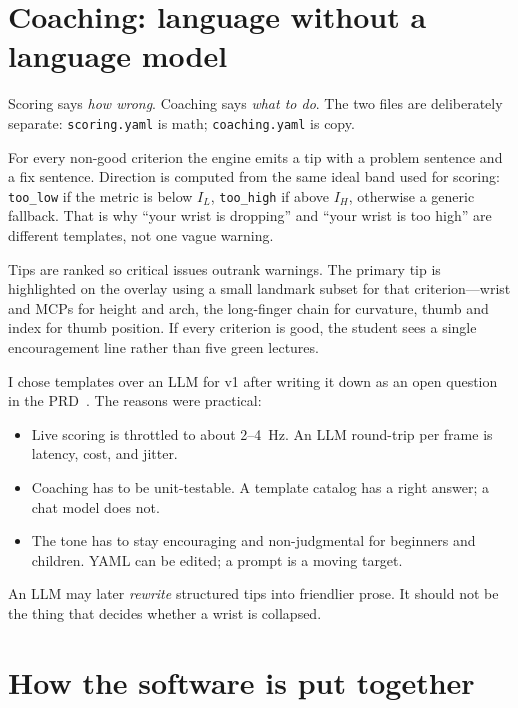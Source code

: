 \documentclass[11pt,a4paper]{article}
\newcommand{\code}[1]{\texttt{#1}}
\begin{document}
\section{Coaching: language without a language model}
\label{sec:coaching}

Scoring says \emph{how wrong}.
Coaching says \emph{what to do}.
The two files are deliberately separate: \code{scoring.yaml} is math; \code{coaching.yaml} is copy.

For every non-good criterion the engine emits a tip with a problem sentence and a fix sentence.
Direction is computed from the same ideal band used for scoring:
\texttt{too\_low} if the metric is below \(I_L\), \texttt{too\_high} if above \(I_H\), otherwise a generic fallback.
That is why \enquote{your wrist is dropping} and \enquote{your wrist is too high} are different templates, not one vague warning.

Tips are ranked so critical issues outrank warnings.
The primary tip is highlighted on the overlay using a small landmark subset for that criterion---wrist and MCPs for height and arch, the long-finger chain for curvature, thumb and index for thumb position.
If every criterion is good, the student sees a single encouragement line rather than five green lectures.

I chose templates over an LLM for v1 after writing it down as an open question in the PRD~\cite{prd}.
The reasons were practical:

\begin{itemize}
  \item Live scoring is throttled to about 2--4~Hz. An LLM round-trip per frame is latency, cost, and jitter.
  \item Coaching has to be unit-testable. A template catalog has a right answer; a chat model does not.
  \item The tone has to stay encouraging and non-judgmental for beginners and children. YAML can be edited; a prompt is a moving target.
\end{itemize}

An LLM may later \emph{rewrite} structured tips into friendlier prose.
It should not be the thing that decides whether a wrist is collapsed.

\section{How the software is put together}
\label{sec:arch}
\end{document}
